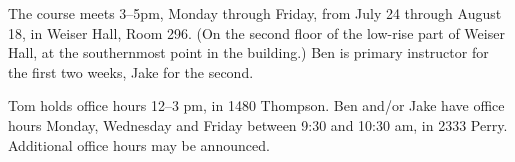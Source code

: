 The course meets 3--5pm, Monday through Friday, from July 24 through
August 18, in Weiser Hall, Room 296. (On the second floor of the
low-rise part of Weiser Hall, at the southernmost point in the
building.)  Ben is primary instructor for the first two weeks, Jake
for the second.

Tom holds office hours 12--3 pm, in 1480 Thompson. Ben and/or Jake
have office hours Monday, Wednesday and Friday between 9:30 and 10:30
am, in 2333 Perry.   Additional office hours may be announced.
